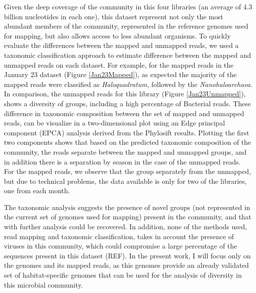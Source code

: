 Given the deep coverage of the community in this four libraries (an average of 4.3 billion nucleotides in each one), this dataset represent not only the most abundant members of the community, represented in the reference genomes used for mapping, but also allows access to less abundant organisms. To quickly evaluate the differences between the mapped and unmapped reads, we used a taxonomic classification approach to estimate difference between the mapped and unmapped reads on each dataset. For example, for the mapped reads in the January 23 dataset (Figure \ref{Jan23Mapped}), as expected the majority of the mapped reads were classified as \textit{Haloquadratum}, followed by the \textit{Nanohaloarchaea}. In comparison, the unmapped reads for this library (Figure \ref{Jan23Unmapped}), shows a diversity of groups, including a high percentage of Bacterial reads. These difference in taxonomic composition between the set of mapped and unmapped reads, can be visualize in a two-dimensional plot using an Edge principal component (EPCA) analysis \cite{Matsen:2011wn} derived from the Phylosift results. Plotting the first two components shows that based on the predicted taxonomic composition of the community, the reads separate between the mapped and unmapped groups, and in addition there is a separation by season in the case of the unmapped reads. For the mapped reads, we observe that the group separately from the unmapped, but due to technical problems, the data available is only for two of the libraries, one from each month. 

The taxonomic analysis suggests the presence of novel groups (not represented in the current set of genomes used for mapping) present in the community, and that with further analysis could be recovered. In addition, none of the methods used, read mapping and taxonomic classification, takes in account the presence of viruses in this community, which could compromise a large percentage of the sequences present in this dataset (REF). In the present work, I will focus only on the genomes and its mapped reads, as this genomes provide an already validated set of habitat-specific genomes that can be used for the analysis of diversity in this microbial community.


